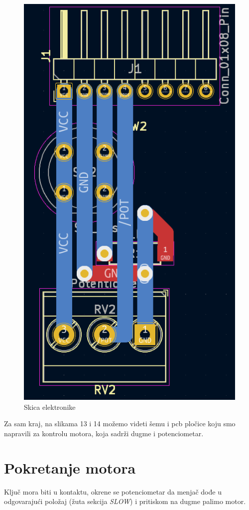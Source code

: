 \documentclass[a4paper, 11pt, titlepage]{article}
\begin{document}
\begin{figure}[htbp]
    \centering
    \includegraphics[angle = 270, width=0.8\linewidth]{pcb_plocice.png}
    \caption{Skica elektronike}
\end{figure}


Za sam kraj, na slikama 13 i 14 možemo videti šemu i pcb pločice koju smo napravili za kontrolu motora, koja sadrži dugme i potenciometar. 


\newpage
\section{Pokretanje motora}

Ključ mora biti u kontaktu, okrene se potenciometar da menjač dođe u odgovarajući položaj (žuta sekcija \textit{SLOW}) i pritiskom na dugme palimo motor. 
\end{document}
